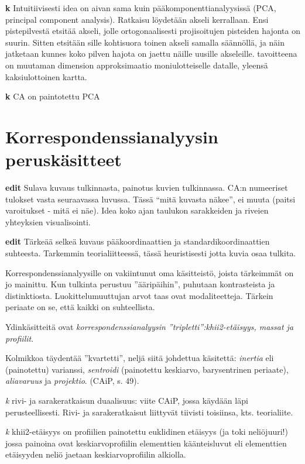 \documentclass[
  finnish,
]{book}
\begin{document}
\textbf{k} Intuitiivisesti idea on aivan sama kuin pääkomponenttianalyysissä
(PCA, principal component analysis). Ratkaisu löydetään akseli kerrallaan.
Ensi pistepilvestä etsitää akseli, jolle ortogonaalisesti projisoitujen
pisteiden hajonta on suurin. Sitten etsitään sille kohtisuora toinen akseli
samalla säännöllä, ja näin jatketaan kunnes koko pilven hajota on jaettu näille
uusille akseleille. tavoitteena on muutaman dimension approksimaatio
moniulotteiselle datalle, yleensä kaksiulottoinen kartta.

\textbf{k} CA on paintotettu PCA

\hypertarget{korrespondenssianalyysin-peruskuxe4sitteet}{%
\section{Korrespondenssianalyysin peruskäsitteet}\label{korrespondenssianalyysin-peruskuxe4sitteet}}

\textbf{edit} Sulava kuvaus tulkinnasta, painotus kuvien tulkinnassa. CA:n numeeriset
tulokset vasta seuraavassa luvussa. Tässä ``mitä kuvasta näkee'', ei muuta (paitsi
varoitukset - mitä ei näe). Idea koko ajan taulukon sarakkeiden ja riveien yhteyksien
visualisointi.

\textbf{edit} Tärkeää selkeä kuvaus pääkoordinaattien ja standardikoordinaattien
suhteesta. Tarkemmin teorialiitteessä, tässä heuristisesti jotta kuvia osaa tulkita.

Korrespondenssianalyysille on vakiintunut oma käsitteistö, joista tärkeimmät on
jo mainittu. Kun tulkinta perustuu ''ääripäihin'', puhutaan kontrasteista ja
distinktiosta. Luokittelumuuttujan arvot taas ovat modaliteetteja.
Tärkein periaate on se, että kaikki on suhteellista.

Ydinkäsitteitä ovat
\emph{korrespondenssianalyysin ''tripletti'':khii2-etäisyys, massat ja profiilit}.

Kolmikkoa täydentää ''kvartetti'', neljä siitä johdettua käsitettä: \emph{inertia} eli
(painotettu) varianssi, \emph{sentroidi} (painotettu keskiarvo, barysentrinen periaate),
\emph{aliavaruus} ja \emph{projektio}. (CAiP, s. 49).

\emph{k} rivi- ja sarakeratkaisun duaalisuus: viite CAiP, jossa käydään läpi
perusteellisesti. Rivi- ja sarakeratkaisut liittyvät tiivisti toisiinsa, kts.
teorialiite.

\emph{k} khii2-etäisyys on profiilien painotettu euklidinen etäisyys (ja toki
neliöjuuri!) jossa painoina ovat keskiarvoprofiilin elementtien käänteisluvut
eli elementtien etäisyyden neliö jaetaan keskiarvoprofiilin alkiolla.
\end{document}
